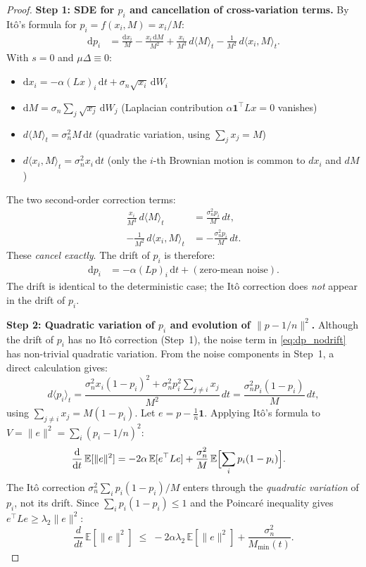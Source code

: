 \begin{proof}
\textbf{Step 1: SDE for $p_i$ and cancellation of cross-variation terms.}
By Itô's formula for $p_i = f(x_i,M) = x_i/M$:
\begin{align}
  \mathrm{d}p_i
  &= \frac{\mathrm{d}x_i}{M}
   - \frac{x_i\,\mathrm{d}M}{M^2}
   + \frac{x_i}{M^3}\,d\langle M\rangle_t
   - \frac{1}{M^2}\,d\langle x_i,M\rangle_t.
  \label{eq:ito_quotient}
\end{align}
With $s=0$ and $\mu\Delta\equiv 0$:
\begin{itemize}
  \item $\mathrm{d}x_i = -\alpha(Lx)_i\,\mathrm{d}t + \sigma_n\sqrt{x_i}\,\mathrm{d}W_i$
  \item $\mathrm{d}M = \sigma_n\sum_j\sqrt{x_j}\,\mathrm{d}W_j$
    (Laplacian contribution $\alpha\mathbf{1}^\top Lx=0$ vanishes)
  \item $d\langle M\rangle_t = \sigma_n^2 M\,\mathrm{d}t$
    (quadratic variation, using $\sum_j x_j=M$)
  \item $d\langle x_i,M\rangle_t = \sigma_n^2 x_i\,\mathrm{d}t$
    (only the $i$-th Brownian motion is common to $dx_i$ and $dM$)
\end{itemize}
The two second-order correction terms:
\begin{align*}
  \frac{x_i}{M^3}\,d\langle M\rangle_t &= \frac{\sigma_n^2 p_i}{M}\,dt, \\
  -\frac{1}{M^2}\,d\langle x_i,M\rangle_t &= -\frac{\sigma_n^2 p_i}{M}\,dt.
\end{align*}
These \emph{cancel exactly}.  The drift of $p_i$ is therefore:
\begin{align}
  \mathrm{d}p_i
  &= -\alpha(Lp)_i\,\mathrm{d}t
   + (\text{zero-mean noise}).
  \label{eq:dp_nodrift}
\end{align}
The drift is identical to the deterministic case; the Itô correction does
\emph{not} appear in the drift of $p_i$.

\textbf{Step 2: Quadratic variation of $p_i$ and evolution of $\|p-1/n\|^2$.}
Although the drift of $p_i$ has no Itô correction (Step~1), the noise term
in \eqref{eq:dp_nodrift} has non-trivial quadratic variation.
From the noise components in Step~1, a direct calculation gives:
\begin{equation}
  d\langle p_i\rangle_t
  = \frac{\sigma_n^2 x_i(1-p_i)^2 + \sigma_n^2 p_i^2 \sum_{j\neq i} x_j}{M^2}\,dt
  = \frac{\sigma_n^2 p_i(1-p_i)}{M}\,dt,
  \label{eq:qv_pi}
\end{equation}
using $\sum_{j\neq i}x_j = M(1-p_i)$.
Let $e = p - \frac{1}{n}\mathbf{1}$.
Applying Itô's formula to $V=\|e\|^2=\sum_i(p_i-1/n)^2$:
\begin{align}
  \frac{\mathrm{d}}{\mathrm{d}t}\,\mathbb{E}[\|e\|^2]
  &= -2\alpha\,\mathbb{E}[e^\top Le]
   + \frac{\sigma_n^2}{M}\,\mathbb{E}\Bigl[\sum_i p_i(1-p_i)\Bigr].
  \label{eq:d_deviation_sq}
\end{align}
The Itô correction $\sigma_n^2\sum_i p_i(1-p_i)/M$ enters through the
\emph{quadratic variation} of $p_i$, not its drift.
Since $\sum_i p_i(1-p_i) \le 1$ and the Poincaré inequality gives
$e^\top Le\ge\lambda_2\|e\|^2$:
\[
  \frac{d}{dt}\,\mathbb{E}[\|e\|^2]
  \;\leq\; -2\alpha\lambda_2\,\mathbb{E}[\|e\|^2] + \frac{\sigma_n^2}{M_{\min}(t)}.
\]


\end{proof}

